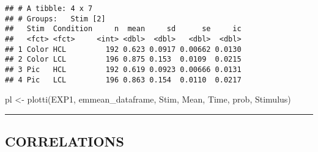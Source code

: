 \documentclass[
]{article}
\newenvironment{Shaded}{\begin{snugshade}}{\end{snugshade}}
\newcommand{\AlertTok}[1]{\textcolor[rgb]{0.94,0.16,0.16}{#1}}
\newcommand{\AttributeTok}[1]{\textcolor[rgb]{0.77,0.63,0.00}{#1}}
\newcommand{\CommentTok}[1]{\textcolor[rgb]{0.56,0.35,0.01}{\textit{#1}}}
\newcommand{\DocumentationTok}[1]{\textcolor[rgb]{0.56,0.35,0.01}{\textbf{\textit{#1}}}}
\newcommand{\FunctionTok}[1]{\textcolor[rgb]{0.00,0.00,0.00}{#1}}
\newcommand{\NormalTok}[1]{#1}
\newcommand{\OtherTok}[1]{\textcolor[rgb]{0.56,0.35,0.01}{#1}}
\newcommand{\SpecialCharTok}[1]{\textcolor[rgb]{0.00,0.00,0.00}{#1}}
\newcommand{\StringTok}[1]{\textcolor[rgb]{0.31,0.60,0.02}{#1}}
\begin{document}
\begin{verbatim}
## # A tibble: 4 x 7
## # Groups:   Stim [2]
##   Stim  Condition     n  mean     sd      se     ic
##   <fct> <fct>     <int> <dbl>  <dbl>   <dbl>  <dbl>
## 1 Color HCL         192 0.623 0.0917 0.00662 0.0130
## 2 Color LCL         196 0.875 0.153  0.0109  0.0215
## 3 Pic   HCL         192 0.619 0.0923 0.00666 0.0131
## 4 Pic   LCL         196 0.863 0.154  0.0110  0.0217
\end{verbatim}

\begin{Shaded}
\begin{Highlighting}[]
\NormalTok{pl }\OtherTok{\textless{}{-}} \FunctionTok{plotti}\NormalTok{(EXP1, emmean\_dataframe, }\StringTok{\textquotesingle{}Stim\textquotesingle{}}\NormalTok{, }\StringTok{\textquotesingle{}Mean\textquotesingle{}}\NormalTok{, }\StringTok{\textquotesingle{}Time\textquotesingle{}}\NormalTok{, }\StringTok{\textquotesingle{}prob\textquotesingle{}}\NormalTok{, }\StringTok{\textquotesingle{}Stimulus\textquotesingle{}}\NormalTok{)}
\end{Highlighting}
\end{Shaded}

\begin{center}\rule{0.5\linewidth}{0.5pt}\end{center}

\hypertarget{correlations}{%
\subsection{CORRELATIONS}\label{correlations}}

\begin{Shaded}
\end{Shaded}
\end{document}

